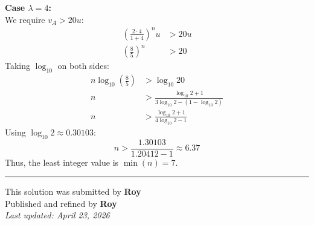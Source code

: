 ﻿\documentclass[12pt]{article}
\begin{document}
\vspace{0.5cm}
\textbf{Case $\lambda = 4$:} \\
We require $v_A > 20u$:
\begin{align*}
    \left(\frac{2 \cdot 4}{1+4}\right)^n u &> 20u \\
    \left(\frac{8}{5}\right)^n &> 20
\end{align*}
Taking $\log_{10}$ on both sides:
\begin{align*}
    n \log_{10}\left(\frac{8}{5}\right) &> \log_{10} 20 \\
    n &> \frac{\log_{10} 2 + 1}{3\log_{10} 2 - (1 - \log_{10} 2)} \\
    n &> \frac{\log_{10} 2 + 1}{4\log_{10} 2 - 1}
\end{align*}
Using $\log_{10} 2 \approx 0.30103$:
\begin{equation*}
    n > \frac{1.30103}{1.20412 - 1} \approx 6.37
\end{equation*}
Thus, the least integer value is $\min(n) = 7$.


\bigskip
\hrule

\begin{center}
    This solution was submitted by \textbf{Roy}\\[4pt]
    Published and refined by \textbf{Roy}\\[8pt]
	\textit{Last updated: April 23, 2026}
\end{center}
\end{document}
